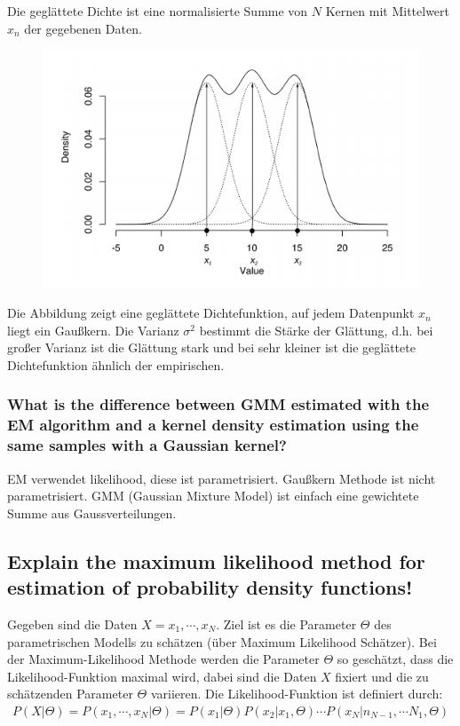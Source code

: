 \documentclass[12pt]{scrartcl}
\begin{document}
Die geglättete Dichte ist eine normalisierte Summe von $N$ Kernen mit Mittelwert $x_n$ der gegebenen Daten.
\begin{figure}[htb]
  \begin{center}
  \includegraphics[scale=0.35]{dichte}
  \end{center}
  \vspace{-\baselineskip}
\end{figure}
Die Abbildung zeigt eine geglättete Dichtefunktion, auf jedem Datenpunkt $x_n$ liegt ein Gaußkern. Die Varianz $\sigma^2$ bestimmt die Stärke der Glättung, d.h. bei großer Varianz ist die Glättung stark und bei sehr kleiner ist die geglättete Dichtefunktion ähnlich der empirischen.

\subsubsection{What is the difference between GMM estimated with the EM algorithm and a kernel density estimation using the same samples with a Gaussian kernel?}

EM verwendet likelihood, diese ist parametrisiert. Gaußkern Methode ist nicht parametrisiert. GMM (Gaussian Mixture Model) ist einfach eine gewichtete Summe aus Gaussverteilungen.

\subsection{Explain the maximum likelihood method for estimation of probability density functions!}
\label{ML}
Gegeben sind die Daten $X = x_1, \cdots ,x_N$. Ziel ist es die Parameter $\Theta$ des parametrischen Modells zu schätzen (über Maximum Likelihood Schätzer). Bei der Maximum-Likelihood Methode werden die Parameter $\Theta$ so geschätzt, dass die Likelihood-Funktion maximal wird, dabei sind die Daten $X$ fixiert und die zu schätzenden Parameter $\Theta$ variieren.
Die Likelihood-Funktion ist definiert durch:
\begin{align*}
P(X|\Theta) = P(x_1, \cdots ,x_N | \Theta) = P(x_1|\Theta)P(x_2|x_1,\Theta) \cdots P(x_N|n_{N-1}, \cdots N_1,\Theta)
\end{align*}
\end{document}
